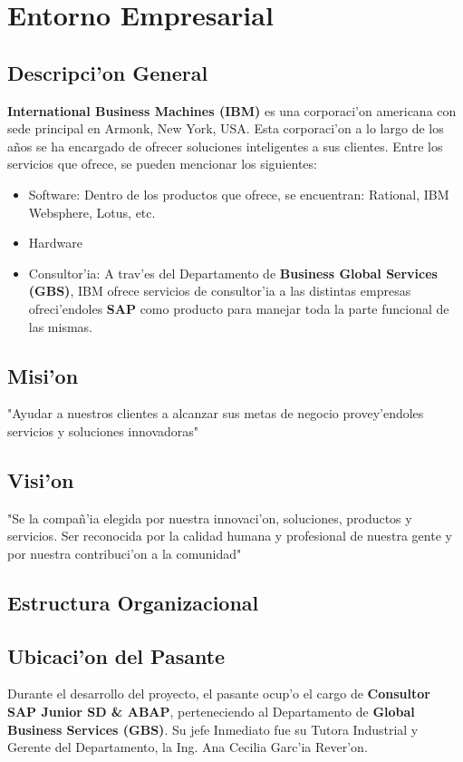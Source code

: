 \chapter{Entorno Empresarial} \label{chap:empresa}



\section{Descripci'on General} \label{sect:descripcion}
\textbf{International Business Machines (IBM)} es una corporaci'on americana con sede principal en Armonk, New York, USA. Esta corporaci'on a lo largo de los a\~nos se ha encargado de ofrecer soluciones inteligentes a sus clientes. Entre los servicios que ofrece, se pueden mencionar los siguientes:
\begin{itemize}
\item Software: Dentro de los productos que ofrece, se encuentran: Rational, IBM Websphere, Lotus, etc.
\item Hardware
\item Consultor'ia: A trav'es del Departamento de \textbf{Business Global Services (GBS)}, IBM ofrece servicios de consultor'ia a las distintas empresas ofreci'endoles \textbf{SAP} como producto para manejar toda la parte funcional de las mismas.
\end{itemize}

\section{Misi'on} \label{sect:mision}
"Ayudar a nuestros clientes a alcanzar sus metas de negocio provey'endoles servicios y soluciones innovadoras"

\section{Visi'on} \label{sect:vision}
"Se la compa\~n'ia elegida por nuestra innovaci'on, soluciones, productos y servicios. Ser reconocida por la calidad humana y profesional de nuestra gente y por nuestra contribuci'on a la comunidad"

\section{Estructura Organizacional} \label{sect:organizacion}

\section{Ubicaci'on del Pasante}
	Durante el desarrollo del proyecto, el pasante ocup'o el cargo de \textbf{Consultor SAP Junior SD \& ABAP}, perteneciendo al Departamento de  \textbf{Global Business Services (GBS)}. Su jefe Inmediato fue su Tutora Industrial y Gerente del Departamento, la Ing. Ana Cecilia Garc'ia Rever'on. 